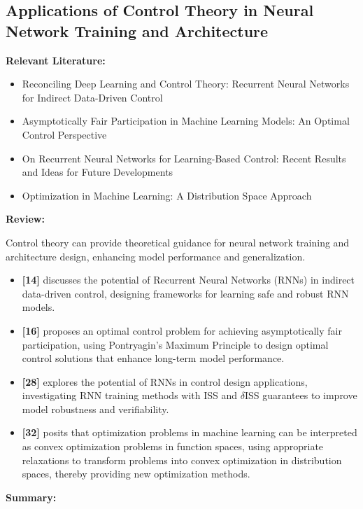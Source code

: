 \documentclass{article}
\theoremstyle{plain}
\theoremstyle{definition}
\theoremstyle{remark}
\begin{document}
\subsection{Applications of Control Theory in Neural Network Training and Architecture}
\textbf{Relevant Literature:}
\begin{itemize}
    \item Reconciling Deep Learning and Control Theory: Recurrent Neural Networks for Indirect Data-Driven Control
    \item Asymptotically Fair Participation in Machine Learning Models: An Optimal Control Perspective
    \item On Recurrent Neural Networks for Learning-Based Control: Recent Results and Ideas for Future Developments
    \item Optimization in Machine Learning: A Distribution Space Approach
\end{itemize}

\textbf{Review:}

Control theory can provide theoretical guidance for neural network training and architecture design, enhancing model performance and generalization.

\begin{itemize}
    \item \textbf{[14]} discusses the potential of Recurrent Neural Networks (RNNs) in indirect data-driven control, designing frameworks for learning safe and robust RNN models.
    
    \item \textbf{[16]} proposes an optimal control problem for achieving asymptotically fair participation, using Pontryagin's Maximum Principle to design optimal control solutions that enhance long-term model performance.
    
    \item \textbf{[28]} explores the potential of RNNs in control design applications, investigating RNN training methods with ISS and $\delta$ISS guarantees to improve model robustness and verifiability.
    
    \item \textbf{[32]} posits that optimization problems in machine learning can be interpreted as convex optimization problems in function spaces, using appropriate relaxations to transform problems into convex optimization in distribution spaces, thereby providing new optimization methods.
\end{itemize}

\textbf{Summary:}
\end{document}
